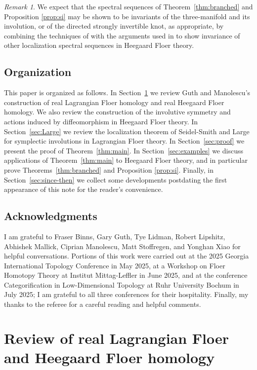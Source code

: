 \documentclass[11pt,reqno]{amsart}
\theoremstyle{definition}
\theoremstyle{remark}
\newtheorem{rem}[thm]{Remark}
\numberwithin{equation}{section}
\begin{document}
\begin{rem} We expect that the spectral sequences of Theorem~\ref{thm:branched} and Proposition \ref{prop:si} may be shown to be invariants of the three-manifold and its involution, or of the directed strongly invertible knot, as appropriate, by combining the techniques of \cite{GM:real} with the arguments used in \cite[Section 5]{HLS-equivariant} to show invariance of other localization spectral sequences in Heegaard Floer theory.
\end{rem}

\subsection*{Organization} This paper is organized as follows. In Section~\ref{sec:realhf} we review Guth and Manolescu's construction of real Lagrangian Floer homology and real Heegaard Floer homology. We also review the construction of the involutive symmetry and actions induced by diffeomorphism in Heegaard Floer theory. In Section~\ref{sec:Large} we review the localization theorem of Seidel-Smith and Large for symplectic involutions in Lagrangian Floer theory. In Section~\ref{sec:proof} we present the proof of Theorem~\ref{thm:main}. In Section~\ref{sec:examples} we discuss applications of Theorem~\ref{thm:main} to Heegaard Floer theory, and in particular prove Theorems~\ref{thm:branched} and Proposition \ref{prop:si}. Finally, in Section~\ref{sec:since-then} we collect some developments postdating the first appearance of this note for the reader's convenience.


\subsection*{Acknowledgments} I am grateful to Fraser Binns, Gary Guth, Tye Lidman, Robert Lipshitz, Abhishek Mallick, Ciprian Manolescu, Matt Stoffregen, and Yonghan Xiao for helpful conversations. Portions of this work were carried out at the 2025 Georgia International Topology Conference in May 2025, at a Workshop on Floer Homotopy Theory at Institut Mittag-Leffler in June 2025, and at the conference Categorification in Low-Dimensional Topology at Ruhr University Bochum in July 2025; I am grateful to all three conferences for their hospitality. Finally, my thanks to the referee for a careful reading and helpful comments.

\section{Review of real Lagrangian Floer and Heegaard Floer homology} \label{sec:realhf}
\end{document}
